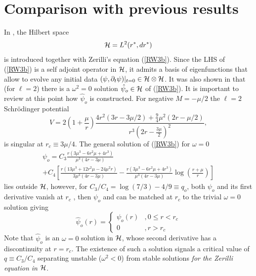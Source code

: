 \documentclass[12pt,aps,floats,showpacs,amssymb,tightenlines]{revtex4}
\newcommand{\m}{\mu}
\newcommand{\w}{\omega}
\begin{document}
\section{Comparison with  previous results} \label{sean}

In \cite{ghi}, the Hilbert space
\begin{equation} \label{hs}
{\cal H} = L^2(r^*,dr^*)
\end{equation}
is introduced together with Zerilli's equation (\ref{RW3b}). Since
the LHS of (\ref{RW3b}) is a self adjoint operator in ${\cal H}$, it
admits a basis of eigenfunctions that allow to evolve any initial
data $(\psi, \partial_t \psi)|_{t=0} \in  {\cal H} \otimes {\cal
H}$. It was also shown in \cite{ghi} that (for $\ell = 2$) there
is a $\w^2= 0$ solution  $\hat \psi_o \in {\cal H}$ of (\ref{RW3b}).
It is important to review at this point how $\hat \psi_o$ is
constructed. For negative $M = -\m /2$ the $\ell=2$ Schr\"odinger
potential
\begin{equation}
V = 2 \left( 1+\frac{\m}{r} \right) \frac{4 r^2 \left(3 r -3 \m/2
\right) + \frac{9}{4}\m^2 \left(2 r - \m/2 \right) }{ r^3 \left( 2 r
- \frac{3 \m}{2} \right) ^2 },
\end{equation}
is singular at $r_c \equiv 3 \m /4$. The general solution of
(\ref{RW3b}) for $\omega=0$ \cite{ghi}
\begin{multline}
\psi_o = C_3 \frac{r (3 \m^3- 6 r^2 \m + 4 r^3)}{\m ^3 (4r -3 \m)}
\\+ C_4 \left[\frac{r (13 \m^3 +  12 r^2 \m - 24 \m^2 r)}{3 \m ^3 (4r
-3 \m)} - \frac{r (3 \m^3- 6 r^2 \m + 4 r^3)}{\m ^3 (4r -3 \m)} \log
\left( \frac{r+\m}{r} \right) \right]
\end{multline}
lies outside ${\cal H}$, however, for $C_3 /C_4 = \log(7/3)  - 4/9
\equiv q_o$, both $\psi_o$ and its first derivative vanish at $r_c$
\cite{ghi}, then $\psi_o$ and can be matched at $r_c$ to the trivial
$\w=0$ solution giving
\begin{equation} \label{nosol}
\hat \psi_o (r) = \begin{cases} \psi_o(r) & , 0 \leq r < r_c  \\
0 & , r > r_c \end{cases}
\end{equation}
Note that $\hat \psi_o$ is an $\w=0$ solution in ${\cal H}$, whose
second derivative has a discontinuity at $r=r_c$. The existence of
such a solution signals a critical value of $q \equiv C_3/C_4$
separating unstable ($\omega^2 < 0$)
from stable solutions {\em for the Zerilli equation in ${\cal H}$}.\\
\end{document}
